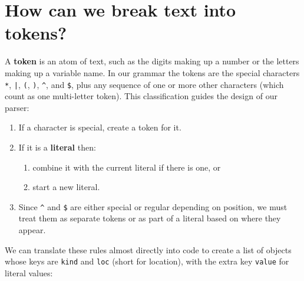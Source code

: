 \documentclass[krantzl]{krantz}
\newcommand{\glossref}[1]{\textbf{#1}}
\begin{document}
\section{How can we break text into tokens?}\label{regex-parser-tokenize}


A \glossref{token} is an atom of text,
such as the digits making up a number or the letters making up a variable name.
In our grammar the tokens are the special characters \texttt{*}, \texttt{|}, \texttt{(}, \texttt{)}, \texttt{{\textasciicircum}}, and \texttt{\$},
plus any sequence of one or more other characters (which count as one multi-letter token).
This classification guides the design of our parser:

\begin{enumerate}

\item 

If a character is special, create a token for it.



\item 

If it is a \glossref{literal} then:

\begin{enumerate}

\item combine it with the current literal if there is one, or

\item start a new literal.

\end{enumerate}



\item 

Since \texttt{{\textasciicircum}} and \texttt{\$} are either special or regular depending on position,
    we must treat them as separate tokens or as part of a literal
    based on where they appear.



\end{enumerate}


We can translate these rules almost directly into code
to create a list of objects whose keys are \texttt{kind} and \texttt{loc} (short for location),
with the extra key \texttt{value} for literal values:
\end{document}
